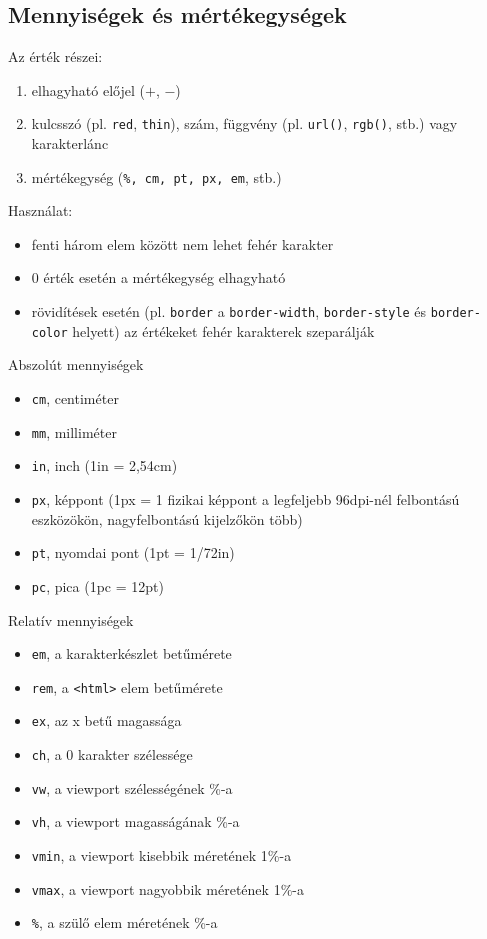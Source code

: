 \subsection{Mennyiségek és mértékegységek}

\begin{frame}
  Az érték részei:
  \begin{enumerate}
    \item elhagyható előjel ($+$, $-$)
    \item kulcsszó (pl. \texttt{red}, \texttt{thin}), szám, függvény (pl. \texttt{url()}, \texttt{rgb()}, stb.) vagy karakterlánc
    \item mértékegység (\texttt{\%, cm, pt, px, em}, stb.)
  \end{enumerate}
  Használat:
  \begin{itemize}
    \item fenti három elem között nem lehet fehér karakter
    \item 0 érték esetén a mértékegység elhagyható
    \item rövidítések esetén (pl. \texttt{border} a \texttt{border-width}, \texttt{border-style} és \texttt{border-color} helyett) az értékeket fehér karakterek szeparálják
  \end{itemize}
\end{frame}

\begin{frame}
  Abszolút mennyiségek
  \begin{itemize}
    \item \texttt{cm}, centiméter
    \item \texttt{mm}, milliméter
    \item \texttt{in}, inch (1in = 2,54cm)
    \item \texttt{px}, képpont (1px = 1 fizikai képpont a legfeljebb 96dpi-nél felbontású eszközökön, nagyfelbontású kijelzőkön több)
    \item \texttt{pt}, nyomdai pont (1pt = 1/72in)
    \item \texttt{pc}, pica (1pc = 12pt)
  \end{itemize}
\end{frame}

\begin{frame}
  Relatív mennyiségek
  \begin{itemize}
    \item \texttt{em}, a karakterkészlet betűmérete
    \item \texttt{rem}, a \texttt{<html>} elem betűmérete
    \item \texttt{ex}, az x betű magassága
    \item \texttt{ch}, a 0 karakter szélessége
    \item \texttt{vw}, a viewport szélességének \%-a
    \item \texttt{vh}, a viewport magasságának \%-a
    \item \texttt{vmin}, a viewport kisebbik méretének 1\%-a
    \item \texttt{vmax}, a viewport nagyobbik méretének 1\%-a
    \item \texttt{\%}, a szülő elem méretének \%-a
  \end{itemize}
\end{frame}

